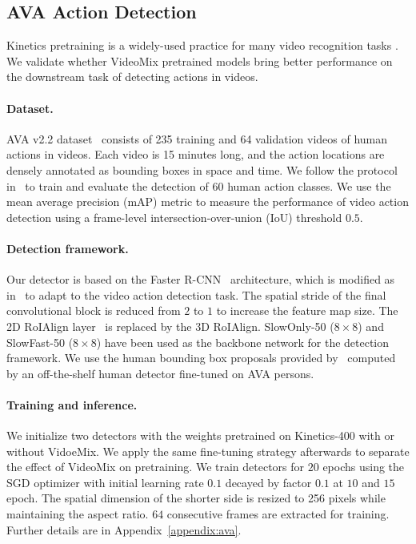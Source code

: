 
\subsection{AVA Action Detection}
\label{section:experiments:ava}

Kinetics pretraining is a widely-used practice for many video recognition tasks \cite{gu2018ava,sun2018actor,feichtenhofer2019slowfast}. 
We validate whether VideoMix pretrained models bring better performance on the downstream task of detecting actions in videos. 

\paragraph{Dataset.}
AVA v2.2 dataset~\cite{gu2018ava} consists of 235 training and 64 validation videos of human actions in videos. 
Each video is 15 minutes long, and the action locations are densely annotated as bounding boxes in space and time.
We follow the protocol in~\cite{gu2018ava} to train and evaluate the detection of 60 human action classes.
We use the mean average precision (mAP) metric to measure the performance of video action detection using a frame-level intersection-over-union (IoU) threshold $0.5$.

\paragraph{Detection framework.}
Our detector is based on the Faster R-CNN~\cite{ren2015faster} architecture, which is modified as in~\cite{feichtenhofer2019slowfast} to adapt to the video action detection task.
The spatial stride of the final convolutional block is reduced from $2$ to $1$ to increase the feature map size. The 2D RoIAlign layer~\cite{he2017mask} is replaced by the 3D RoIAlign. 
SlowOnly-50 ($8\times8$) and SlowFast-50 ($8\times8$) have been used as the backbone network for the detection framework. 
We use the human bounding box proposals provided by~\cite{feichtenhofer2019slowfast} computed by an off-the-shelf human detector fine-tuned on AVA persons. 

\paragraph{Training and inference.}

We initialize two detectors with the weights pretrained on Kinetics-400 with or without VidoeMix. We apply the same fine-tuning strategy afterwards to separate the effect of VideoMix on pretraining. 
We train detectors for $20$ epochs using the SGD optimizer with initial learning rate $0.1$ decayed by factor $0.1$ at $10$ and $15$ epoch.
The spatial dimension of the shorter side is resized to 256 pixels while maintaining the aspect ratio. 
$64$ consecutive frames are extracted for training.
Further details are in Appendix~\ref{appendix:ava}. 

